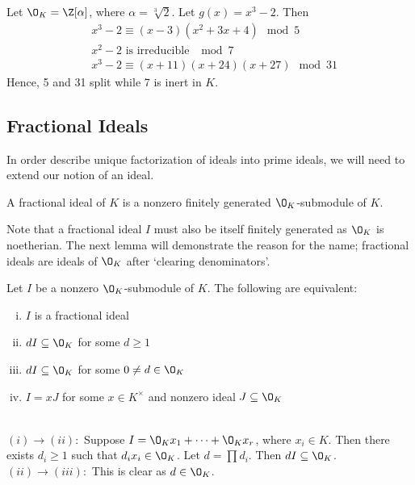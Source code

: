 \begin{ex}
Let $\O_K=\Z[\alpha]$, where $\alpha=\sqrt[3]{2}$. Let $g(x)=x^3-2$. Then
	\[
	\begin{split}
	&x^3-2 \equiv (x-3)(x^2+3x+4) \mod 5 \\
	&x^2-2 \text{ is irreducible } \mod 7 \\
	&x^3 - 2 \equiv (x+11)(x+24)(x+27) \mod 31
	\end{split}
	\]
Hence, 5 and 31 split while 7 is inert in $K$. \xqed
\end{ex}



\subsection{Fractional Ideals}

In order describe unique factorization of ideals into prime ideals, we will need to extend our notion of an ideal. 

\begin{dfn}
A fractional ideal of $K$ is a nonzero finitely generated $\O_K$-submodule of $K$. 
\end{dfn} 

Note that a fractional ideal $I$ must also be itself finitely generated as $\O_K$ is noetherian. The next lemma will demonstrate the reason for the name; fractional ideals are ideals of $\O_K$ after `clearing denominators'.

\begin{lem}\label{lem:fracideal}
Let $I$ be a nonzero $\O_K$-submodule of $K$. The following are equivalent:
	\begin{enumerate}[(i)]
	\item $I$ is a fractional ideal
	\item $dI \subseteq \O_K$ for some $d \geq 1$
	\item $dI \subseteq \O_K$ for some $0 \neq d \in \O_K$
	\item $I=xJ$ for some $x \in K^\times$ and nonzero ideal $J \subseteq \O_K$
	\end{enumerate}
\end{lem}

\pf \\
\noindent $(i) \to (ii):$ Suppose $I= \O_K x_1 + \cdots + \O_K x_r$, where $x_i \in K$. Then there exists $d_i \geq 1$ such that $d_ix_i \in \O_K$. Let $d= \prod d_i$. Then $dI \subseteq \O_K$. \\

\noindent $(ii)\to (iii):$ This is clear as $d \in \O_K$. \\

